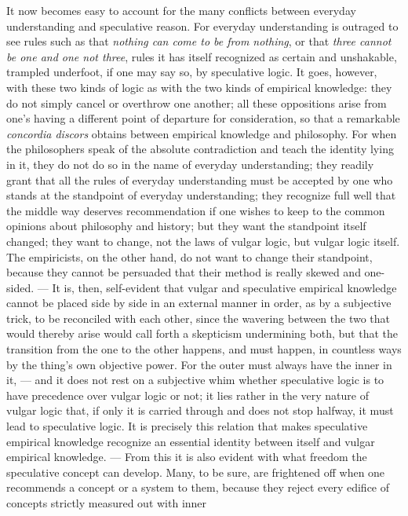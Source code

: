 \documentclass[12pt]{book}
\newcommand{\opage}[1]{\marginnote{\footnotesize\textit{[#1]}}}
\begin{document}
It now becomes easy to account for the many conflicts between everyday
understanding and speculative reason. For everyday understanding is outraged to
see rules such as that \emph{nothing can come to be from nothing}, or that
\emph{three cannot be one and one not three}, rules it has itself recognized as
certain and unshakable, trampled underfoot, if one may say so, by speculative
logic. It goes, however, with these two kinds of logic as with the two kinds of
empirical knowledge: they do not simply cancel or overthrow one another; all
these oppositions arise from one's having a different point of departure for
consideration, so that a remarkable \textit{concordia discors} obtains between
empirical knowledge and philosophy. For when the philosophers speak of the
absolute contradiction and teach the identity lying in it, they do not do so in
the name of everyday understanding; they readily grant that
\opage{29} all the rules of everyday understanding must be accepted by one who stands at
the standpoint of everyday understanding; they recognize full well that the
middle way deserves recommendation if one wishes to keep to the common opinions
about philosophy and history; but they want the standpoint itself changed; they
want to change, not the laws of vulgar logic, but vulgar logic itself. The
empiricists, on the other hand, do not want to change their standpoint, because
they cannot be persuaded that their method is really skewed and one-sided. ---
It is, then, self-evident that vulgar and speculative empirical knowledge
cannot be placed side by side in an external manner in order, as by a
subjective trick, to be reconciled with each other, since the wavering between
the two that would thereby arise would call forth a skepticism undermining both,
but that the transition from the one to the other happens, and must happen, in
countless ways by the thing's own objective power. For the outer must always
have the inner in it, --- and it does not rest on a subjective whim whether
speculative logic is to have precedence over vulgar logic or not; it lies
rather in the very nature of vulgar logic that, if only it is carried through
and does not stop halfway, it must lead to speculative logic. It is precisely
this relation that makes speculative empirical knowledge recognize an essential
identity between itself and vulgar empirical knowledge. --- From this it is
also evident with what freedom the speculative concept can develop. Many, to be
sure, are frightened off when one recommends a concept or a system to them,
because they reject every edifice of concepts strictly measured out with inner
\end{document}
